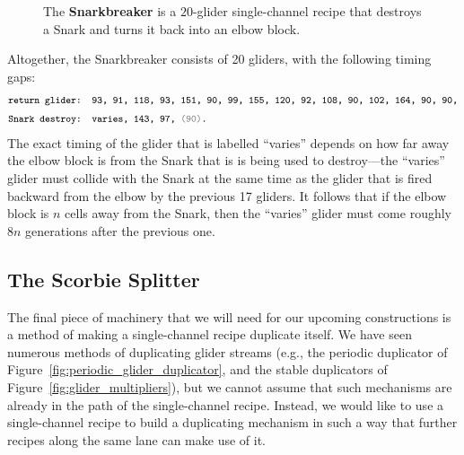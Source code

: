 \begin{figure}[!htb]
	\centering
	
	\caption{The \textbf{Snarkbreaker} is a $20$-glider single-channel recipe that destroys a Snark and turns it back into an elbow block.}\label{fig:snarkbreaker}
\end{figure}

Altogether, the Snarkbreaker consists of 20 gliders, with the following timing gaps:
\begin{align*}
& \text{\texttt{\footnotesize return glider: {\footnotesize 93, 91, 118, 93, 151, 90, 99, 155, 120, 92, 108, 90, 102, 164, 90, 90,}}} \\
& \text{\texttt{\footnotesize Snark destroy: {\footnotesize varies, 143, 97, {\color{gray}(90)}.}}}
\end{align*}
The exact timing of the glider that is labelled ``varies'' depends on how far away the elbow block is from the Snark that is is being used to destroy---the ``varies'' glider must collide with the Snark at the same time as the glider that is fired backward from the elbow by the previous 17 gliders. It follows that if the elbow block is $n$ cells away from the Snark, then the ``varies'' glider must come roughly $8n$ generations after the previous one.



\subsection{The Scorbie Splitter}\label{sec:scorbie_splitter}

The final piece of machinery that we will need for our upcoming constructions is a method of making a single-channel recipe duplicate itself. We have seen numerous methods of duplicating glider streams (e.g., the periodic duplicator of Figure~\ref{fig:periodic_glider_duplicator}, and the stable duplicators of Figure~\ref{fig:glider_multipliers}), but we cannot assume that such mechanisms are already in the path of the single-channel recipe. Instead, we would like to use a single-channel recipe to build a duplicating mechanism in such a way that further recipes along the same lane can make use of it.

